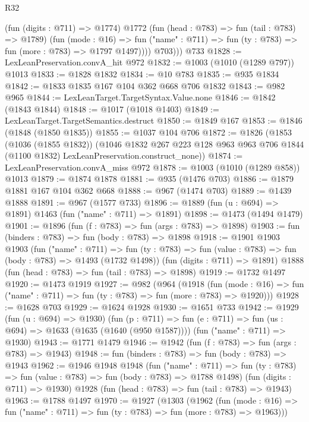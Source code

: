 \begin{lexlean}{R32}
\begin{coremodule}
              (fun (digits : @711) => @1774)
              @1772
              (fun (head : @783) => fun (tail : @783) => @1789)
              (fun (mode : @16) =>
              fun ("name" : @711) => fun (ty : @783) => fun (more : @783) => @1797 @1497))))
          @703)))
    @733
@1828 := LexLeanPreservation.convA_hit @972
@1832 := @1003 (@1010 (@1289 @797)) @1013
@1833 := @1828 @1832
@1834 := @10 @783
@1835 := @935 @1834
@1842 := @1833 @1835 @167 @104 @362 @668 @706 @1832
@1843 := @982 @965
@1844 := LexLeanTarget.TargetSyntax.Value.none
@1846 := @1842 (@1843 @1844)
@1848 := @1017 (@1018 @1403)
@1849 := LexLeanTarget.TargetSemantics.destruct
@1850 := @1849 @167
@1853 := @1846 (@1848 (@1850 @1835))
@1855 := @1037 @104 @706
@1872 := @1826
    (@1853
      (@1036 (@1855 @1832))
      (@1046
        @1832
        @267
        @223
        @128
        @963
        @963
        @706
        @1844
        (@1100 @1832)
        LexLeanPreservation.construct_none))
@1874 := LexLeanPreservation.convA_miss @972
@1878 := @1003 (@1010 (@1289 @858)) @1013
@1879 := @1874 @1878
@1881 := @935 (@1476 @703)
@1886 := @1879 @1881 @167 @104 @362 @668
@1888 := @967 (@1474 @703)
@1889 := @1439 @1888
@1891 := @967 (@1577 @733)
@1896 := @1889 (fun (u : @694) => @1891) @1463 (fun ("name" : @711) => @1891)
@1898 := @1473 (@1494 @1479)
@1901 := @1896 (fun (f : @783) => fun (args : @783) => @1898)
@1903 := fun (binders : @783) => fun (body : @783) => @1898
@1918 := @1901
    @1903
    @1903
    (fun ("name" : @711) =>
    fun (ty : @783) => fun (value : @783) => fun (body : @783) => @1493 (@1732 @1498))
    (fun (digits : @711) => @1891)
    @1888
    (fun (head : @783) => fun (tail : @783) => @1898)
@1919 := @1732 @1497
@1920 := @1473 @1919
@1927 := @982
    (@964
      (@1918
        (fun (mode : @16) => fun ("name" : @711) => fun (ty : @783) => fun (more : @783) => @1920)))
@1928 := @1628 @703
@1929 := @1624 @1928
@1930 := @1651 @733
@1942 := @1929
    (fun (u : @694) => @1930)
    (fun (p : @711) => fun (e : @711) => fun (us : @694) => @1633 (@1635 (@1640 (@950 @1587))))
    (fun ("name" : @711) => @1930)
@1943 := @1771 @1479
@1946 := @1942 (fun (f : @783) => fun (args : @783) => @1943)
@1948 := fun (binders : @783) => fun (body : @783) => @1943
@1962 := @1946
    @1948
    @1948
    (fun ("name" : @711) =>
    fun (ty : @783) => fun (value : @783) => fun (body : @783) => @1788 @1498)
    (fun (digits : @711) => @1930)
    @1928
    (fun (head : @783) => fun (tail : @783) => @1943)
@1963 := @1788 @1497
@1970 := @1927
    (@1303
      (@1962
        (fun (mode : @16) => fun ("name" : @711) => fun (ty : @783) => fun (more : @783) => @1963)))

\end{coremodule}
\end{lexlean}
